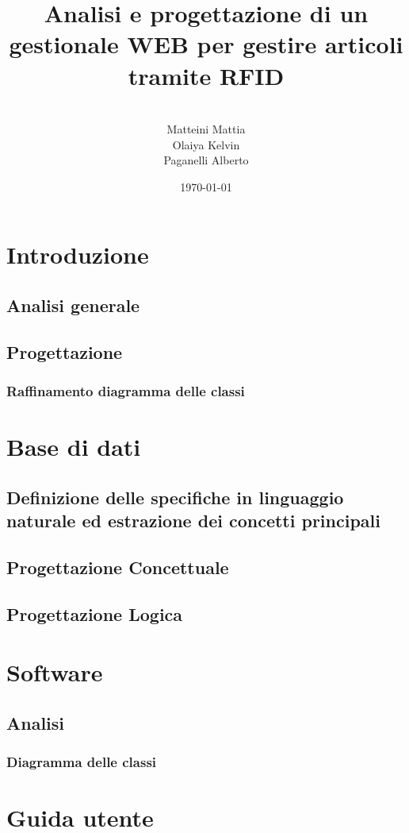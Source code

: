 \documentclass[a4paper,12pt]{report}
\title{Analisi e progettazione di un gestionale WEB per gestire articoli tramite RFID}
\author{
\\Matteini Mattia
\\Olaiya Kelvin
\\Paganelli Alberto
}
\date{\today}
\begin{document}
\maketitle

\tableofcontents


\chapter{Introduzione}

\section{Analisi generale}


\section{Progettazione}
\subsection{Raffinamento diagramma delle classi}


\chapter{Base di dati}

\section{Definizione delle specifiche in linguaggio naturale ed estrazione dei concetti principali}

\section{Progettazione Concettuale}

\section{Progettazione Logica}


\chapter{Software}

\section{Analisi}

\subsection{Diagramma delle classi}


\chapter{Guida utente}
\end{document}

